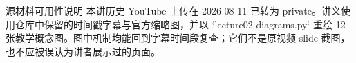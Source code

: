 \makecscover

\begin{warningbox}{源材料可用性说明}
本讲历史 YouTube 上传在 2026-08-11 已转为 private。讲义使用仓库中保留的时间戳字幕与官方缩略图，并以 `lecture02-diagrams.py` 重绘 12 张教学概念图。图中机制均能回到字幕时间段复查；它们不是原视频 slide 截图，也不应被误认为讲者展示过的页面。
\end{warningbox}

